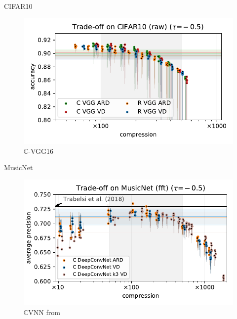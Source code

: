 \documentclass{beamer}
\newcommand{\real}{\mathbb{R}}
\newcommand{\cplx}{\mathbb{C}}
\begin{document}
\begin{frame}[c]{CIFAR10}{\insertsection}
  \begin{figure}[t]
    \centering
    \includegraphics[width=\linewidth]{figure__cifar__trade-off/appendix__augmentedcifar10__raw__-0.5.pdf}
    \\
    {$\cplx$-VGG16}
  \end{figure}

\end{frame}

\begin{frame}[c]{MusicNet}{\insertsection}
  \begin{figure}[t]
    \centering
    \includegraphics[width=\linewidth]{figure__musicnet__trade-off/paper__musicnetram__fft__-0.5.pdf}
    \\
    {$\cplx$VNN from \cite{trabelsi_deep_2018}}
  \end{figure}

\end{frame}
\end{document}
